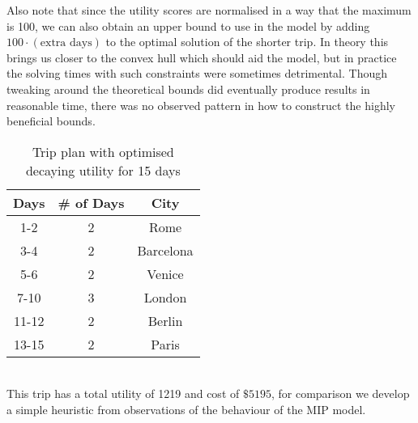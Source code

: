 \documentclass[a4paper]{article}
\begin{document}
Also note that since the utility scores are normalised in a way that the maximum is 100, we can also obtain an upper bound to use in the model by adding $100 \cdot (\text{extra days})$ to the optimal solution of the shorter trip. In theory this brings us closer to the convex hull which should aid the model, but in practice the solving times with such constraints were sometimes detrimental. Though tweaking around the theoretical bounds did eventually produce results in reasonable time, there was no observed pattern in how to construct the highly beneficial bounds. \\
\begin{table}[h]
\caption{Trip plan with optimised decaying utility for 15 days}
\centering
\begin{tabular}{c|c|c}
	\hline
	\rule{0pt}{2ex} Days & \# of Days & City \\
	\hline
	1-2 & 2 & Rome \\
	3-4 & 2 & Barcelona \\
	5-6 & 2 & Venice \\
	7-10 & 3 & London \\
	11-12 & 2 & Berlin \\
	13-15 & 2 & Paris \\
	\hline
\end{tabular}
\vspace{1mm}
\end{table}\\
This trip has a total utility of 1219 and cost of $\$5195$, for comparison we develop a simple heuristic from observations of the behaviour of the MIP model.
\end{document}

